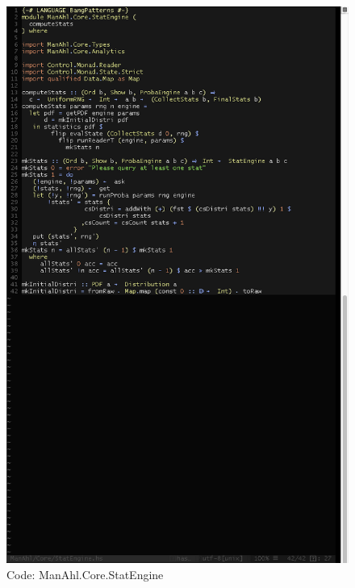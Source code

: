 \documentclass[12pt,a4paper,article]{memoir} %
\begin{document}
\begin{figure}[h!]
\centering
\includegraphics[width=1\textwidth]{img/code-se.png}
\caption{Code: ManAhl.Core.StatEngine}
\label{fig:core.se}
\end{figure}
\end{document}
